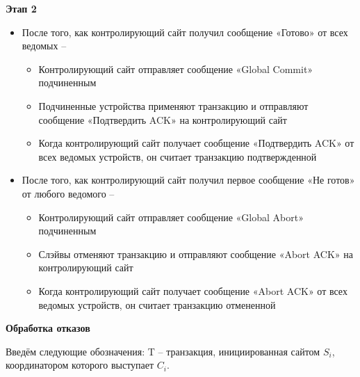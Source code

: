 \textbf{Этап 2}

\begin{itemize}
    \item После того, как контролирующий сайт получил сообщение «Готово» от всех ведомых \autocite{FixProtocols} –
    \begin{itemize}
        \item Контролирующий сайт отправляет сообщение «Global Commit» подчиненным
        \item Подчиненные устройства применяют транзакцию и отправляют сообщение «Подтвердить ACK» на контролирующий сайт
        \item Когда контролирующий сайт получает сообщение «Подтвердить ACK» от всех ведомых
        устройств, он считает транзакцию подтвержденной
    \end{itemize}
    \item После того, как контролирующий сайт получил первое сообщение «Не готов» от любого ведомого –
    \begin{itemize}
        \item Контролирующий сайт отправляет сообщение «Global Abort» подчиненным
        \item Слэйвы отменяют транзакцию и отправляют сообщение «Abort ACK» на контролирующий сайт
        \item Когда контролирующий сайт получает сообщение «Abort ACK» от всех ведомых
        устройств, он считает транзакцию отмененной
    \end{itemize}

\end{itemize}
\textbf{Обработка отказов}

Введём следующие обозначения: T -- транзакция, инициированная сайтом $S_i$, координатором которого выступает $C_i$.

